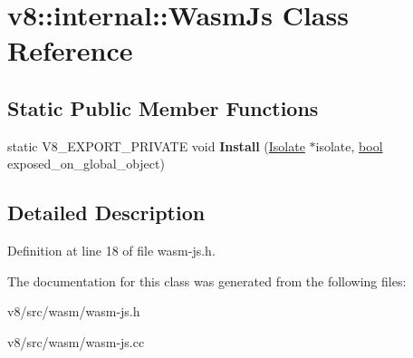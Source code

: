 \hypertarget{classv8_1_1internal_1_1WasmJs}{}\section{v8\+:\+:internal\+:\+:Wasm\+Js Class Reference}
\label{classv8_1_1internal_1_1WasmJs}
\subsection*{Static Public Member Functions}
\begin{DoxyCompactItemize}
\item 
\mbox{\label{classv8_1_1internal_1_1WasmJs_a892dbee6891b2de2e21afdf16d34d919}} 
static V8\+\_\+\+E\+X\+P\+O\+R\+T\+\_\+\+P\+R\+I\+V\+A\+TE void {\bfseries Install} (\mbox{\hyperlink{classv8_1_1internal_1_1Isolate}{Isolate}} $\ast$isolate, \mbox{\hyperlink{classbool}{bool}} exposed\+\_\+on\+\_\+global\+\_\+object)
\end{DoxyCompactItemize}


\subsection{Detailed Description}


Definition at line 18 of file wasm-\/js.\+h.



The documentation for this class was generated from the following files\+:\begin{DoxyCompactItemize}
\item 
v8/src/wasm/wasm-\/js.\+h\item 
v8/src/wasm/wasm-\/js.\+cc\end{DoxyCompactItemize}
